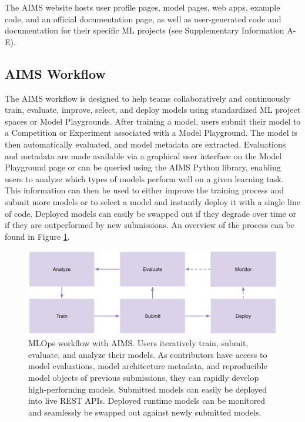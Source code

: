 The AIMS website hosts user profile pages, model pages, web apps, example code, and an official documentation page, as well as user-generated code and documentation for their specific ML projects (see Supplementary Information A-E). 


\subsection{AIMS Workflow}
The AIMS workflow is designed to help teams collaboratively and continuously train, evaluate, improve, select, and deploy models using standardized ML project spaces or Model Playgrounds. After training a model, users submit their model to a Competition or Experiment associated with a Model Playground. The model is then automatically evaluated, and model metadata are extracted. Evaluations and metadata are made available via a graphical user interface on the Model Playground page or can be queried using the AIMS Python library, enabling users to analyze which types of models perform well on a given learning task. This information can then be used to either improve the training process and submit more models or to select a model and instantly deploy it with a single line of code. Deployed models can easily be swapped out if they degrade over time or if they are outperformed by new submissions. An overview of the process can be found in Figure \ref{fig:fig_aims_workflow}.


\begin{figure}
  \centering
  \includegraphics[width=1\textwidth]{figures/fig_aims_workflow.png}
  \caption{MLOps workflow with AIMS. Users iteratively train, submit, evaluate, and analyze their models. As contributors have access to model evaluations, model architecture metadata, and reproducible model objects of previous submissions, they can rapidly develop high-performing models. Submitted models can easily be deployed into live REST APIs. Deployed runtime models can be monitored and seamlessly be swapped out against newly submitted models.}
  \label{fig:fig_aims_workflow}
\end{figure}


